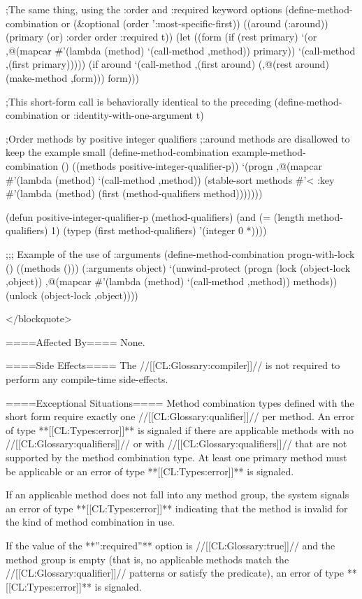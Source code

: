 ;The same thing, using the :order and :required keyword options (define-method-combination or (&optional (order ':most-specific-first)) ((around (:around)) (primary (or) :order order :required t)) (let ((form (if (rest primary) `(or ,@(mapcar #'(lambda (method) `(call-method ,method)) primary)) `(call-method ,(first primary))))) (if around `(call-method ,(first around) (,@(rest around) (make-method ,form))) form)))

;This short-form call is behaviorally identical to the preceding (define-method-combination or :identity-with-one-argument t)

;Order methods by positive integer qualifiers ;:around methods are disallowed to keep the example small (define-method-combination example-method-combination () ((methods positive-integer-qualifier-p)) `(progn ,@(mapcar #'(lambda (method) `(call-method ,method)) (stable-sort methods #'< :key #'(lambda (method) (first (method-qualifiers method)))))))

(defun positive-integer-qualifier-p (method-qualifiers) (and (= (length method-qualifiers) 1) (typep (first method-qualifiers) '(integer 0 *))))

;;; Example of the use of :arguments (define-method-combination progn-with-lock () ((methods ())) (:arguments object) `(unwind-protect (progn (lock (object-lock ,object)) ,@(mapcar #'(lambda (method) `(call-method ,method)) methods)) (unlock (object-lock ,object))))

</blockquote>

====Affected By====
None.

====Side Effects====
The //[[CL:Glossary:compiler]]// is not required to perform any compile-time side-effects.

====Exceptional Situations====
Method combination types defined with the short form require exactly one //[[CL:Glossary:qualifier]]// per method. An error of type **[[CL:Types:error]]** is signaled if there are applicable methods with no //[[CL:Glossary:qualifiers]]// or with //[[CL:Glossary:qualifiers]]// that are not supported by the method combination type. At least one primary method must be applicable or an error of type **[[CL:Types:error]]** is signaled.

If an applicable method does not fall into any method group, the system signals an error of type **[[CL:Types:error]]** indicating that the method is invalid for the kind of method combination in use.

If the value of the **'':required''** option is //[[CL:Glossary:true]]// and the method group is empty (that is, no applicable methods match the //[[CL:Glossary:qualifier]]// patterns or satisfy the predicate), an error of type **[[CL:Types:error]]** is signaled.

